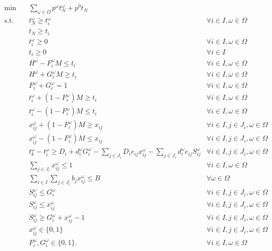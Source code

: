 \documentclass[11pt]{article}
\begin{document}
	\begin{subequations} \label{prob:extensive}
		\begin{align}
			\min \quad & \sum_{\omega \in \Omega} p^\omega t_N^\omega + p^0 t_N& \\
			\text{s.t.} \quad & t_N^\omega \geq t_i^\omega & \forall i \in I, \omega \in \Omega \\
			& t_N \geq t_i & \\
			& t_i^\omega \geq 0 & \forall i \in I, \omega \in \Omega\\
			& t_i \geq 0 & \forall i \in I\\
			& H^\omega - F_i^\omega M \leq t_i & \forall i \in I, \omega \in \Omega \label{cons:f}\\
			& H^\omega + G_i^\omega M \geq t_i & \forall i \in I, \omega \in \Omega \label{cons:g}\\
			& F_i^\omega + G_i^\omega = 1 & \forall i \in I, \omega \in \Omega \label{cons:fg}\\
			& t_i^\omega + (1 - F_i^\omega)M \geq t_i & \forall i \in I, \omega \in \Omega \label{cons:tf1}\\
			& t_i^\omega - (1 - F_i^\omega)M \leq t_i & \forall i \in I, \omega \in \Omega \label{cons:tf2}\\
			& x_{ij}^\omega + (1 - F_i^\omega)M \geq x_{ij} & \forall i \in I, j \in J_i, \omega \in \Omega \label{cons:xf1}\\
			& x_{ij}^\omega - (1 - F_i^\omega)M \leq x_{ij} & \forall i \in I, j \in J_i, \omega \in \Omega \label{cons:xf2}\\
			& t_k^\omega - t_i^\omega \geq D_i + d_i^\omega G_i^\omega -\sum_{j \in J_i} D_i e_{ij} x_{ij}^\omega - \sum_{j \in J_i} d_i^\omega e_{ij} S_{ij}^\omega & \forall i \in I, j \in J_i, \omega \in \Omega \label{cons:duration}\\
			& \sum_{j \in J_i} x_{ij}^\omega \leq 1 & \forall i \in I, \omega \in \Omega \label{cons:crashLim}\\
			& \sum_{i \in I}\sum_{j \in J_i} b_jx_{ij}^\omega \leq B & \forall \omega \in \Omega \label{cons:budget}\\
			& S_{ij}^\omega \leq G_i^\omega & \forall i \in I, j \in J_i, \omega \in \Omega \label{cons:linearize1}\\
			& S_{ij}^\omega \leq x_{ij}^\omega & \forall i \in I, j \in J_i, \omega \in \Omega \label{cons:linearize2}\\
			& S_{ij}^\omega \geq G_i^\omega + x_{ij}^\omega - 1 & \forall i \in I, j \in J_i, \omega \in \Omega \label{cons:linearize3}\\
			& x_{ij}^\omega \in \{0,1\} & \forall i \in I, j \in J_i, \omega \in \Omega\\
			& F_i^\omega, G_i^\omega \in \{0,1\}. & \forall i \in I, \omega \in \Omega
		\end{align}
	\end{subequations}
	
\end{document}
